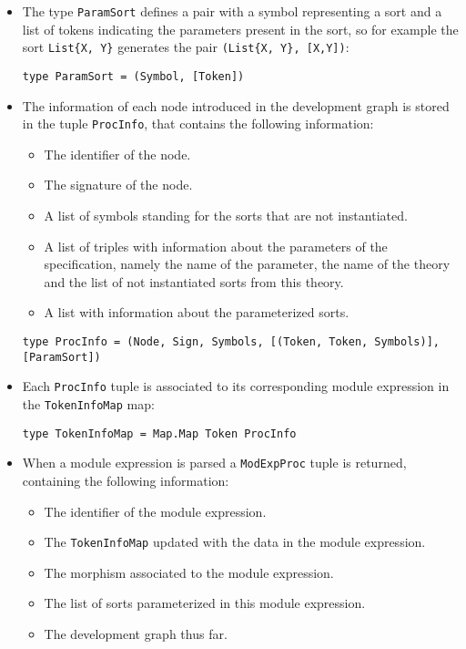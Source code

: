 \begin{itemize}

\item The type \verb"ParamSort" defines a pair with a symbol representing
a sort and a list of tokens indicating the parameters present in the sort,
so for example the sort \verb"List{X, Y}" generates the pair
\verb"(List{X, Y}, [X,Y])":

{\codesize
\begin{verbatim}
type ParamSort = (Symbol, [Token])
\end{verbatim}
}

\item The information of each node introduced
in the development graph is stored in the tuple \verb"ProcInfo", that
contains the following information:

\begin{itemize}
\item The identifier of the node.
\item The signature of the node.
\item A list of symbols standing for the sorts that are not instantiated.
\item A list of triples with information about the parameters of the
specification, namely the name of the parameter, the name of the theory
and the list of not instantiated sorts from this theory.
\item A list with information about the parameterized sorts.
\end{itemize}

{\codesize
\begin{verbatim}
type ProcInfo = (Node, Sign, Symbols, [(Token, Token, Symbols)], [ParamSort])
\end{verbatim}
}

\item Each \verb"ProcInfo" tuple is associated to its corresponding module
expression in the \verb"TokenInfoMap" map:

{\codesize
\begin{verbatim}
type TokenInfoMap = Map.Map Token ProcInfo
\end{verbatim}
}

\item When a module expression is parsed a \verb"ModExpProc" tuple is
returned, containing the following information:

\begin{itemize}
\item The identifier of the module expression.
\item The \verb"TokenInfoMap" updated with the data in the module
expression.
\item The morphism associated to the module expression.
\item The list of sorts parameterized in this module expression.
\item The development graph thus far.
\end{itemize}


\end{itemize}

